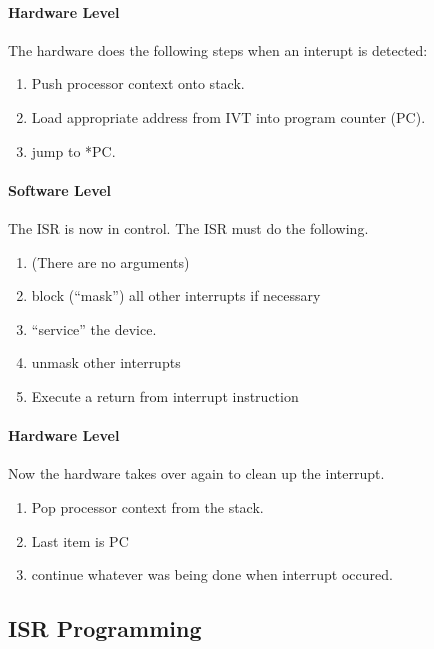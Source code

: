 \documentclass{article}	%
\begin{document}
\paragraph{Hardware Level}

 The hardware does the following steps when an interupt	%
is detected:	%

\begin{enumerate}
        \item Push processor context onto stack.
        \item Load appropriate address from IVT into
        program counter (PC).
        \item jump to *PC.
\end{enumerate}

\paragraph{Software Level}

 The ISR is now in control.  The ISR must do the	%
 following.	%

\begin{enumerate}
        \item (There are no arguments)
        \item block (``mask'') all other interrupts if necessary
        \item ``service'' the device.
        \item unmask other interrupts
        \item  Execute a return from interrupt instruction
\end{enumerate}

\paragraph{Hardware Level}

Now the hardware takes over again to clean up the interrupt.	%

\begin{enumerate}
        \item Pop processor context from the stack.
        \item Last item is PC
        \item continue whatever was being done when interrupt
        occured.
\end{enumerate}



\subsection{ISR Programming}
\end{document}
